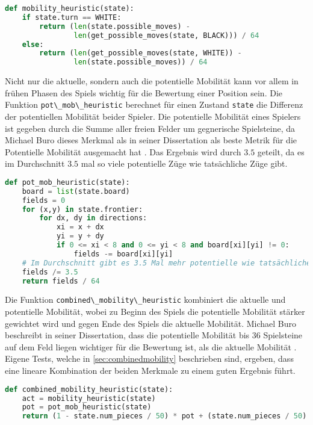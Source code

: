 \begin{lstlisting}[language=Python]
def mobility_heuristic(state):
    if state.turn == WHITE:
        return (len(state.possible_moves) -
                len(get_possible_moves(state, BLACK))) / 64
    else:
        return (len(get_possible_moves(state, WHITE)) -
                len(state.possible_moves)) / 64
\end{lstlisting}

Nicht nur die aktuelle, sondern auch die potentielle Mobilität kann vor
allem in frühen Phasen des Spiels wichtig für die Bewertung einer
Position sein. Die Funktion
\passthrough{\lstinline!pot\_mob\_heuristic!} berechnet für einen
Zustand \passthrough{\lstinline!state!} die Differenz der potentiellen
Mobilität beider Spieler. Die potentielle Mobilität eines Spielers ist
gegeben durch die Summe aller freien Felder um gegnerische Spielsteine,
da Michael Buro dieses Merkmal als in seiner Dissertation als beste
Metrik für die Potentielle Mobilität ausgemacht hat
\cite[S. 9]{evaluationfunctions}. Das Ergebnis wird durch \(3.5\)
geteilt, da es im Durchschnitt \(3.5\) mal so viele potentielle Züge wie
tatsächliche Züge gibt.

\begin{lstlisting}[language=Python]
def pot_mob_heuristic(state):
    board = list(state.board)
    fields = 0
    for (x,y) in state.frontier:
        for dx, dy in directions:
            xi = x + dx
            yi = y + dy
            if 0 <= xi < 8 and 0 <= yi < 8 and board[xi][yi] != 0:
                fields -= board[xi][yi]
    # Im Durchschnitt gibt es 3.5 Mal mehr potentielle wie tatsächliche Züge
    fields /= 3.5 
    return fields / 64
\end{lstlisting}

Die Funktion \passthrough{\lstinline!combined\_mobility\_heuristic!}
kombiniert die aktuelle und potentielle Mobilität, wobei zu Beginn des
Spiels die potentielle Mobilität stärker gewichtet wird und gegen Ende
des Spiels die aktuelle Mobilität. Michael Buro beschreibt in seiner
Dissertation, dass die potentielle Mobilität bis 36 Spielsteine auf dem
Feld liegen wichtiger für die Bewertung ist, als die aktuelle Mobilität
\cite[S. 9]{evaluationfunctions}. Eigene Tests, welche in
\autoref{sec:combinedmobility} beschrieben sind, ergeben, dass eine
lineare Kombination der beiden Merkmale zu einem guten Ergebnis führt.

\begin{lstlisting}[language=Python]
def combined_mobility_heuristic(state):
    act = mobility_heuristic(state)
    pot = pot_mob_heuristic(state)
    return (1 - state.num_pieces / 50) * pot + (state.num_pieces / 50) *  act
\end{lstlisting}

